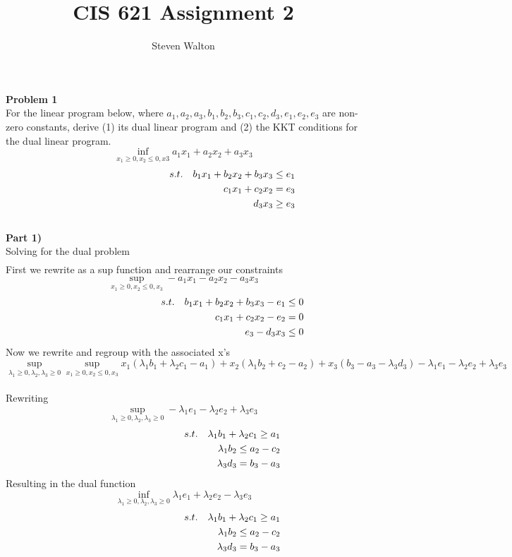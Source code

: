 \documentclass[12pt,letter]{article}
\newcommand{\problem}[1]{\vspace{3mm}\Large\textbf{{Problem {#1}\vspace{3mm}}}\normalsize\\}
\newcommand{\ppart}[1]{\vspace{2mm}\large\textbf{\\Part {#1})\vspace{2mm}}\normalsize\\}
\begin{document}
\title{CIS 621 Assignment 2}
\author{Steven Walton}
\maketitle
\problem{1}
For the linear program below, where $a_1,a_2,a_3,b_1,b_2,b_3,c_1,c_2,d_3,e_1,
e_2,e_3$ are non-zero constants, derive (1) its dual linear program and (2)
the KKT conditions for the dual linear program.
\[
    \inf\limits_{x_1\geq 0, x_2\leq0,x3} a_1x_1 + a_2x_2 + a_3x_3 
\]
\vspace{-0.7cm}
\begin{align*}
    \hspace{3.5cm}s.t. && b_1x_1 + b_2x_2 + b_3x_3 \leq e_1 \\
         && c_1x_1 + c_2x_2 = e_3 \\
         && d_3x_3 \geq e_3
\end{align*}
\ppart{1}
Solving for the dual problem
\begin{align*}
\end{align*}
First we rewrite as a sup function and rearrange our constraints
\[
    \sup\limits_{x_1\geq0, x_2\leq0,x_3} -a_1x_1 - a_2x_2 - a_3x_3
\]
\vspace{-0.7cm}
\begin{align*}
    \hspace{3.5cm}s.t. && b_1x_1 + b_2x_2 + b_3x_3 - e_1 \leq 0 \\
                       && c_1x_1 + c_2x_2 -e_2 = 0 \\
                       && e_3 - d_3x_3 \leq 0
\end{align*}
Now we rewrite and regroup with the associated x's
\[
    \sup\limits_{\lambda_1\geq0,\lambda_2,\lambda_3\geq0}\sup\limits_{x_1\geq0,x_2\leq0,x_3}
    x_1(\lambda_1b_1+\lambda_2c_1-a_1)
    + x_2(\lambda_1b_2 + c_2 -a_2)
    + x_3(b_3 - a_3 -\lambda_3d_3)
    - \lambda_1e_1 - \lambda_2e_2 + \lambda_3e_3
\]
\pagebreak
\\Rewriting
\[
    \sup\limits_{\lambda_1\geq0,\lambda_2,\lambda_3\geq0} -\lambda_1e_1 -\lambda_2e_2 + \lambda_3e_3
\]
\vspace{-0.7cm}
\begin{align*}
    \hspace{3.5cm}s.t. && \lambda_1b_1 + \lambda_2c_1 \geq a_1 \\
                       && \lambda_1b_2 \leq a_2 - c_2 \\
                       && \lambda_3d_3 = b_3 - a_3
\end{align*}
Resulting in the dual function
\[
    \inf\limits_{\lambda_1\geq0,\lambda_2,\lambda_3\geq0} \lambda_1e_1 +\lambda_2e_2 - \lambda_3e_3
\]
\vspace{-0.7cm}
\begin{align*}
    \hspace{3.5cm}s.t. && \lambda_1b_1 + \lambda_2c_1 \geq a_1 \\
                       && \lambda_1b_2 \leq a_2 - c_2 \\
                       && \lambda_3d_3 = b_3 - a_3
\end{align*}
\end{document}
